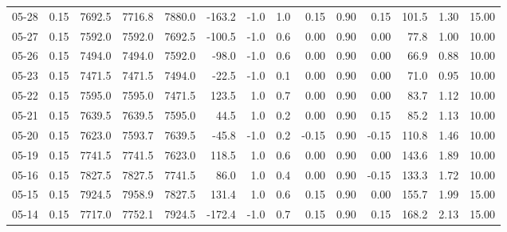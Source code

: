 \begin{threeparttable}
{\begin{tabular}{lrrrrrrrrrrrrr}
  05-28 &     0.15 & 7692.5 & 7716.8 & 7880.0 &     -163.2 &                     -1.0 &                 1.0 &       0.15 &      0.90 &           0.15 &            101.5 &            1.30 &                  15.00 \\
  05-27 &     0.15 & 7592.0 & 7592.0 & 7692.5 &     -100.5 &                     -1.0 &                 0.6 &       0.00 &      0.90 &           0.00 &             77.8 &            1.00 &                  10.00 \\
  05-26 &     0.15 & 7494.0 & 7494.0 & 7592.0 &      -98.0 &                     -1.0 &                 0.6 &       0.00 &      0.90 &           0.00 &             66.9 &            0.88 &                  10.00 \\
  05-23 &     0.15 & 7471.5 & 7471.5 & 7494.0 &      -22.5 &                     -1.0 &                 0.1 &       0.00 &      0.90 &           0.00 &             71.0 &            0.95 &                  10.00 \\
  05-22 &     0.15 & 7595.0 & 7595.0 & 7471.5 &      123.5 &                      1.0 &                 0.7 &       0.00 &      0.90 &           0.00 &             83.7 &            1.12 &                  10.00 \\
  05-21 &     0.15 & 7639.5 & 7639.5 & 7595.0 &       44.5 &                      1.0 &                 0.2 &       0.00 &      0.90 &           0.15 &             85.2 &            1.13 &                  10.00 \\
  05-20 &     0.15 & 7623.0 & 7593.7 & 7639.5 &      -45.8 &                     -1.0 &                 0.2 &      -0.15 &      0.90 &          -0.15 &            110.8 &            1.46 &                  10.00 \\
  05-19 &     0.15 & 7741.5 & 7741.5 & 7623.0 &      118.5 &                      1.0 &                 0.6 &       0.00 &      0.90 &           0.00 &            143.6 &            1.89 &                  10.00 \\
  05-16 &     0.15 & 7827.5 & 7827.5 & 7741.5 &       86.0 &                      1.0 &                 0.4 &       0.00 &      0.90 &          -0.15 &            133.3 &            1.72 &                  10.00 \\
  05-15 &     0.15 & 7924.5 & 7958.9 & 7827.5 &      131.4 &                      1.0 &                 0.6 &       0.15 &      0.90 &           0.00 &            155.7 &            1.99 &                  15.00 \\
  05-14 &     0.15 & 7717.0 & 7752.1 & 7924.5 &     -172.4 &                     -1.0 &                 0.7 &       0.15 &      0.90 &           0.15 &            168.2 &            2.13 &                  15.00 \\

\end{tabular}}
\end{threeparttable}
